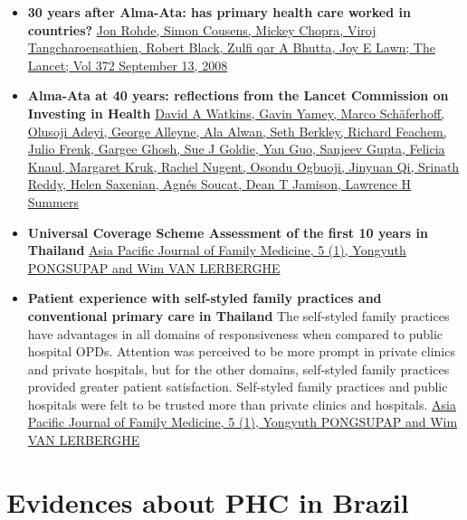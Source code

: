 \documentclass[]{book}
\begin{document}
\begin{itemize}
\item
  \textbf{30 years after Alma-Ata: has primary health care worked in countries?} \href{https://sci-hub.se/https://doi.org/10.1016/S0140-6736(08)61405-1}{Jon Rohde, Simon Cousens, Mickey Chopra, Viroj Tangcharoensathien, Robert Black, Zulfi qar A Bhutta, Joy E Lawn; The Lancet; Vol 372 September 13, 2008}
\item
  \textbf{Alma-Ata at 40 years: reflections from the Lancet Commission on Investing in Health} \href{https://sci-hub.se/https://doi.org/10.1016/S0140-6736(18)32389-4}{David A Watkins, Gavin Yamey, Marco Schäferhoff, Olusoji Adeyi, George Alleyne, Ala Alwan, Seth Berkley, Richard Feachem, Julio Frenk, Gargee Ghosh, Sue J Goldie, Yan Guo, Sanjeev Gupta, Felicia Knaul, Margaret Kruk, Rachel Nugent, Osondu Ogbuoji, Jinyuan Qi, Srinath Reddy, Helen Saxenian, Agnés Soucat, Dean T Jamison, Lawrence H Summers}
\item
  \textbf{Universal Coverage Scheme Assessment of the first 10 years in Thailand} \href{https://www.hsri.or.th/sites/default/files/browse/tor5-1-1.pdf}{Asia Pacific Journal of Family Medicine, 5 (1), Yongyuth PONGSUPAP and Wim VAN LERBERGHE}
\item
  \textbf{Patient experience with self-styled family practices and conventional primary care in Thailand} The self-styled family practices have advantages in all domains of responsiveness when compared to public hospital OPDs. Attention was perceived to be more prompt in private clinics and private hospitals, but for the other domains, self-styled family practices provided greater patient satisfaction. Self-styled family practices and public hospitals were felt to be trusted more than private clinics and hospitals. \href{http://www.apfmj-archive.com/afm5_1/afm27.pdf}{Asia Pacific Journal of Family Medicine, 5 (1), Yongyuth PONGSUPAP and Wim VAN LERBERGHE}
\end{itemize}

\hypertarget{evidences-about-phc-in-brazil}{%
\section*{Evidences about PHC in Brazil}\label{evidences-about-phc-in-brazil}}
\end{document}
